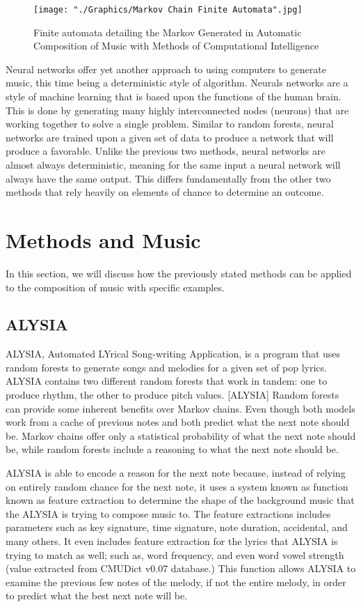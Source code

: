 \documentclass{sig-alternate}
\begin{document}
\begin{figure}[!]
	\texttt{[image: "./Graphics/Markov Chain Finite Automata".jpg]}
	\caption{Finite automata detailing the Markov Generated in Automatic Composition of Music with Methods of Computational Intelligence}
	\label{fig:markovchain1}
\end{figure}

	Neural networks offer yet another approach to using computers to generate music, this time being a deterministic style of algorithm. Neurals networks are a style of machine learning that is based upon the functions of the human brain. This is done by generating many highly interconnected nodes (neurons) that are working together to solve a single problem. Similar to random forests, neural networks are trained upon a given set of data to produce a network that will produce a favorable. Unlike the previous two methods, neural networks are almost always deterministic, meaning for the same input a neural network will always have the same output. This differs fundamentally from the other two methods that rely heavily on elements of chance to determine an outcome.
\section{Methods and Music}
	In this section, we will discuss how the previously stated methods can be applied to the composition of music with specific examples.
\subsection{ALYSIA}
\label{sec:ALYSIA}
	ALYSIA, Automated LYrical Song-writing Application, is a program that uses random forests to generate songs and melodies for a given set of pop lyrics. ALYSIA contains two different random forests that work in tandem: one to produce rhythm, the other to produce pitch values. [ALYSIA] Random forests can provide some inherent benefits over Markov chains. Even though both models work from a cache of previous notes and both predict what the next note should be. Markov chains offer only a statistical probability of what the next note should be, while random forests include a reasoning to what the next note should be.
	
	ALYSIA is able to encode a reason for the next note because, instead of relying on entirely random chance for the next note, it uses a system known as function known as feature extraction to determine the shape of the background music that the ALYSIA is trying to compose music to. The feature extractions includes parameters such as key signature, time signature, note duration, accidental, and many others. It even includes feature extraction for the lyrics that ALYSIA is trying to match as well; such as, word frequency, and even word vowel strength (value extracted from CMUDict v0.07 database.) This function allows ALYSIA to examine the previous few notes of the melody, if not the entire melody, in order to predict what the best next note will be.
\end{document}
